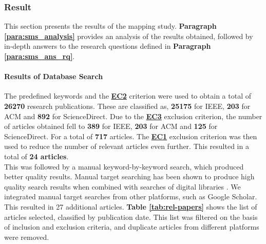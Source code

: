     
        \subsubsection{Result}
        This section presents the results of the mapping study. \textbf{Paragraph \ref{para:sms_analysis}} provides an analysis of the results obtained, followed by in-depth answers to the research questions defined in \textbf{Paragraph \ref{para:sms_ans_rq}}.

            \paragraph{Results of Database Search}
            The predefined keywords and the \hyperref[EC2]{\textbf{EC2}} criterion were used to obtain a total of \textbf{26270} research publications. These are classified as, \textbf{25175} for IEEE, \textbf{203} for ACM and \textbf{892} for ScienceDirect. Due to the \hyperref[EC3]{\textbf{EC3}} exclusion criterion, the number of articles obtained fell to \textbf{389} for IEEE, \textbf{203} for ACM and \textbf{125} for ScienceDirect. For a total of \textbf{717} articles. The \hyperref[EC1]{\textbf{EC1}} exclusion criterion was then used to reduce the number of relevant articles even further. This resulted in a total of \textbf{24 articles}.\\
            This was followed by a manual keyword-by-keyword search, which produced better quality results. Manual target searching has been shown to produce high quality search results when combined with searches of digital libraries \cite{petersen2008systematic}. We integrated manual target searches from other platforms, such as Google Scholar. This resulted in 27 additional articles. \textbf{Table \ref{tab:rel-papers}} shows the list of articles selected, classified by publication date. This list was filtered on the basis of inclusion and exclusion criteria, and duplicate articles from different platforms were removed.\\

